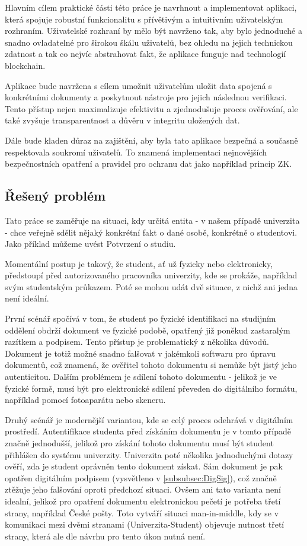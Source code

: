 Hlavním cílem praktické části této práce je navrhnout a implementovat aplikaci, která spojuje robustní funkcionalitu s přívětivým a intuitivním uživatelským rozhraním. Uživatelské rozhraní by mělo být navrženo tak, aby bylo jednoduché a snadno ovladatelné pro širokou škálu uživatelů, bez ohledu na jejich technickou zdatnost a tak co nejvíc abstrahovat fakt, že aplikace funguje nad technologií blockchain.

Aplikace bude navržena s cílem umožnit uživatelům uložit data spojená s konkrétními dokumenty a poskytnout nástroje pro jejich následnou verifikaci. Tento přístup nejen maximalizuje efektivitu a zjednodušuje proces ověřování, ale také zvyšuje transparentnost a důvěru v integritu uložených dat.

Dále bude kladen důraz na zajištění, aby byla tato aplikace bezpečná a současně respektovala soukromí uživatelů. To znamená implementaci nejnovějších bezpečnostních opatření a pravidel pro ochranu dat jako například princip ZK.


\subsection{Řešený problém}


Tato práce se zaměřuje na situaci, kdy určitá entita - v našem případě univerzita - chce veřejně sdělit nějaký konkrétní fakt o dané osobě, konkrétně o studentovi. Jako příklad můžeme uvést Potvrzení o studiu.

Momentální postup je takový, že student, ať už fyzicky nebo elektronicky, předstoupí před autorizovaného pracovníka univerzity, kde se prokáže, například svým studentským průkazem. Poté se mohou udát dvě situace, z nichž ani jedna není ideální.

První scénář spočívá v tom, že student po fyzické identifikaci na studijním oddělení obdrží dokument ve fyzické podobě, opatřený již poněkud zastaralým razítkem a podpisem. Tento přístup je problematický z několika důvodů. Dokument je totiž možné snadno falšovat v jakémkoli softwaru pro úpravu dokumentů, což znamená, že ověřitel tohoto dokumentu si nemůže být jistý jeho autenticitou. Dalším problémem je sdílení tohoto dokumentu - jelikož je ve fyzické formě, musí být pro elektronické sdílení převeden do digitálního formátu, například pomocí fotoaparátu nebo skeneru.

Druhý scénář je modernější variantou, kde se celý proces odehrává v digitálním prostředí. Autentifikace studenta před získáním dokumentu je v tomto případě značně jednodušší, jelikož pro získání tohoto dokumentu musí být student přihlášen do systému univerzity. Univerzita poté několika jednoduchými dotazy ověří, zda je student oprávněn tento dokument získat. Sám dokument je pak opatřen digitálním podpisem (vysvětleno v \ref{subsubsec:DigSig}), což značně ztěžuje jeho falšování oproti předchozí situaci. Ovšem ani tato varianta není idealní, jelikož pro opatření dokumentu elektronickou pečetí je potřeba třetí strany, například České pošty. Toto vytváří situaci man-in-middle, kdy se v komunikaci mezi dvěmi stranami (Univerzita-Student) objevuje nutnost třetí strany, která ale dle návrhu pro tento úkon nutná není.



